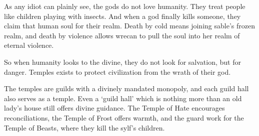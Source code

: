 \begin{multicols}{2}

\label{godsOfDeath}

\noindent
As any idiot can plainly see, the gods do not love humanity.
They treat people like children playing with insects.
And when a god finally kills someone, they claim that human soul for their realm.
Death by cold means joining \gls{sable}'s frozen realm, and death by violence allows \gls{wrecan} to pull the soul into her realm of eternal violence.

So when humanity looks to the divine, they do not look for salvation, but for danger.
Temples exists to protect civilization from the wrath of their god.

The temples are guilds with a divinely mandated monopoly, and each guild hall also serves as a temple.
Even a `guild hall' which is nothing more than an old lady's house still offers divine guidance.
The Temple of Hate encourages reconciliations, the Temple of Frost offers warmth, and the \gls{guard} work for the Temple of Beasts, where they kill the \gls{sylf}'s children.

\newcommand\guild[8]{
  \renewcommand\npcsymbol{#2}
  \vspace{2em}
  \noindent
  \begin{minipage}{\linewidth}
  \subsection[The Temple of #3]{#2~#1~#2 \\ \& \\ The Temple of #3}
  \index{#3 (god)}
  \index{Gods}
  \label{god:#3}

  \begin{exampletext}
  \noindent
  #4
  \end{exampletext}
  \end{minipage}

  \noindent
  \begin{minipage}{\linewidth}
  \begin{description}
  \item[Domain:] #5

  \item[Defence:] #6

  \item[Watchers:] #7

  \item[Activities:] #8

  \end{description}
  \end{minipage}

}
\end{multicols}
